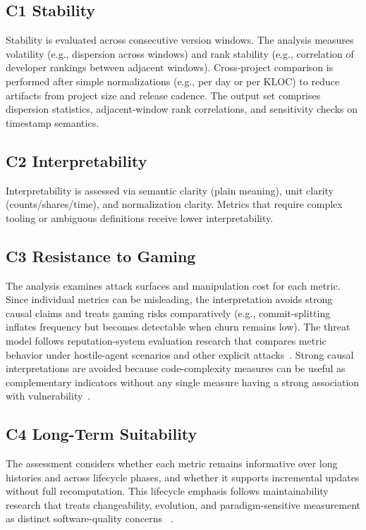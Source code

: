 \subsection{C1 Stability}
\label{sec:criterion_stability}
Stability is evaluated across consecutive version windows. The analysis measures volatility (e.g., dispersion across windows) and
rank stability (e.g., correlation of developer rankings between adjacent windows). Cross-project comparison is performed
after simple normalizations (e.g., per day or per KLOC) to reduce artifacts from project size and release cadence.
The output set comprises dispersion statistics, adjacent-window rank correlations, and sensitivity checks on timestamp semantics.

\subsection{C2 Interpretability}
\label{sec:criterion_interpretability}
Interpretability is assessed via semantic clarity (plain meaning), unit clarity (counts/shares/time), and normalization clarity.
Metrics that require complex tooling or ambiguous definitions receive lower interpretability.

\subsection{C3 Resistance to Gaming}
\label{sec:criterion_gaming}
The analysis examines attack surfaces and manipulation cost for each metric. Since individual metrics can be misleading, the interpretation avoids strong causal claims
and treats gaming risks comparatively (e.g., commit-splitting inflates frequency but becomes detectable when churn remains low).
The threat model follows reputation-system evaluation research that compares metric behavior under hostile-agent scenarios
and other explicit attacks~\cite{koutrouli2015reputation,schlosser2004reputation}. Strong causal interpretations are avoided because
code-complexity measures can be useful as complementary indicators without any single measure having a strong association with
vulnerability~\cite{scvulncomplexity}.

\subsection{C4 Long-Term Suitability}
\label{sec:criterion_longterm}
The assessment considers whether each metric remains informative over long histories and across lifecycle phases, and whether it supports
incremental updates without full recomputation. This lifecycle emphasis follows maintainability research that treats changeability,
evolution, and paradigm-sensitive measurement as distinct software-quality concerns
~\cite{kumar2012maintainability,kapllani2020maintainability,syedmohamad2026maintainability}.

